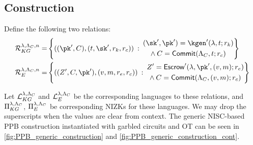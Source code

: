 \subsection{Construction}

Define the following two relations:
\begin{align*}
	\kgrel^{\lambda, \comparams, \numdigits} = & \left\{
	((\pk', \com), (\thr, \sk', r_k, r_c)) \::\:
	\begin{gathered}
		(\sk', \pk') = \kgen'(\lambda, \thr; r_k) \\
		\wedge \: \com = \commit(\comparams, \thr; r_c)
	\end{gathered}
	\right\}                                             \\
	\erel^{\lambda, \comparams, \numdigits} =  & \left\{
	((Z', \com, \pk'), (\uval, \msg, r_e, r_c)) \::\:
	\begin{gathered}
		Z' = \escrow'(\secpar, \pk', (\uval, \msg); r_e) \\
		\wedge \: \com = \commit(\comparams, (\uval, \msg); r_c)
	\end{gathered}
	\right\}
\end{align*}

Let $\mathcal{L}_{KG}^{\lambda, \Lambda_C}$ and $\mathcal{L}_{E}^{\lambda, \Lambda_C}$ be the corresponding languages to these relations, and
$\Pi_{KG}^{\lambda, \Lambda_C}$, $\Pi_{E}^{\lambda, \Lambda_C}$ be corresponding NIZKs for these languages.
We may drop the superscripts when the values are clear from context.
The generic NISC-based PPB construction instantiated with garbled circuits and OT can be seen in \cref{fig:PPB_generic_construction} and \cref{fig:PPB_generic_construction_cont}.



